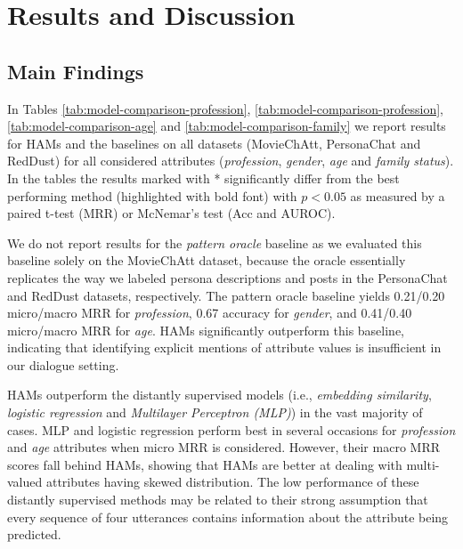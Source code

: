
\section{Results and Discussion}
\label{results}


\subsection{Main Findings}
\label{findings}

In Tables \ref{tab:model-comparison-profession}, \ref{tab:model-comparison-profession}, \ref{tab:model-comparison-age} and \ref{tab:model-comparison-family} we report results for HAMs and the baselines on all datasets (MovieChAtt, PersonaChat and RedDust) for all considered attributes (\textit{profession}, \textit{gender}, \textit{age} and \textit{family status}).
In the tables the results marked with * significantly differ from 
the best performing method (highlighted with bold font)
with $p < 0.05$ as measured by a paired t-test (MRR) or McNemar's test (Acc and AUROC).




We do not report results for the \textit{pattern oracle} baseline as we evaluated this baseline solely on the MovieChAtt dataset, because the oracle essentially replicates the way we labeled persona descriptions and posts in the PersonaChat and RedDust datasets, respectively.
The pattern oracle baseline yields 0.21/0.20 micro/macro MRR for \textit{profession}, 0.67 accuracy for \textit{gender}, and 0.41/0.40 micro/macro MRR for \textit{age}. HAMs significantly outperform this baseline, indicating that identifying explicit mentions of attribute values is insufficient in our dialogue setting.

HAMs outperform the distantly supervised models (i.e., \textit{embedding similarity}, \textit{logistic regression} and \textit{Multilayer Perceptron (MLP)}) in the vast majority of cases.
MLP and logistic regression perform best in several occasions for \textit{profession} and \textit{age} attributes when micro MRR is considered. However, their macro MRR scores fall behind HAMs, showing that HAMs are better at dealing with 
multi-valued attributes having skewed distribution.
The low performance of these distantly supervised methods may be related to their strong assumption that every sequence of four utterances contains information about the attribute being predicted.

